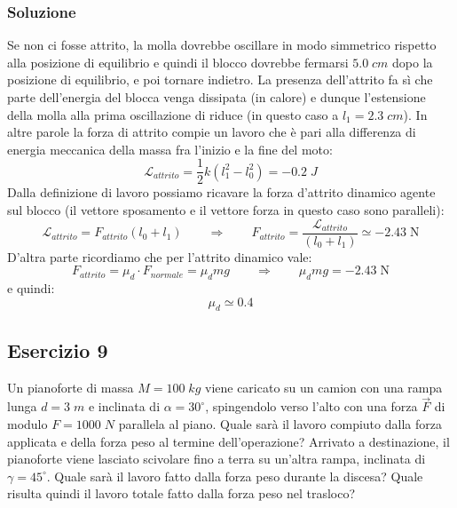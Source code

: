 \documentclass[12pt,a4paper]{book}
\begin{document}
\subsubsection*{Soluzione}
Se non ci fosse attrito, la molla dovrebbe oscillare in modo simmetrico rispetto alla posizione di equilibrio e quindi il blocco dovrebbe fermarsi $5.0\; cm$ dopo la posizione di equilibrio, e poi tornare indietro. La presenza dell'attrito fa sì che parte dell'energia del blocca venga dissipata (in calore) e dunque l'estensione della molla alla prima oscillazione di riduce (in questo caso a $l_1=2.3\;cm$). In altre parole la forza di attrito compie un lavoro che è pari alla differenza di energia meccanica 
della massa fra l'inizio e la fine del moto:
\begin{equation*}
\mathcal{L}
_{attrito}=\frac{1}{2}k(l_1^2-l_0^2)=-0.2\; J
\end{equation*}
Dalla definizione di lavoro possiamo ricavare la forza d'attrito dinamico agente sul blocco (il vettore sposamento 
e il vettore forza in questo caso sono paralleli):
\begin{equation*}
\mathcal{L}
_{attrito}=F_{attrito} (l_0+l_1)\qquad  \Rightarrow \qquad F_{attrito}=\frac{\mathcal{L}
_{attrito}}{(l_0+l_1)} \simeq -2.43 \; \text{N}
\end{equation*}
D'altra parte ricordiamo che per l'attrito dinamico vale:
\begin{equation*}
F_{attrito}=\mu_{d}\cdot F_{normale}=\mu_{d}  mg \qquad  \Rightarrow \qquad \mu_{d} mg=-2.43\; \text{N}
\end{equation*}
e quindi:
\begin{equation*}
\mu_{d}\simeq 0.4
\end{equation*}

\subsection*{Esercizio 9}
Un pianoforte di massa $M=100 \;kg$ viene caricato su un camion con una rampa lunga $d=3\; m$ e inclinata di $\alpha=30^{\circ}$, spingendolo verso l'alto con una forza $\vec{F}$ di modulo $F=1000 \; N$ parallela al piano. Quale sarà il lavoro compiuto dalla forza applicata e della forza peso al termine dell'operazione? Arrivato a destinazione, il pianoforte viene lasciato scivolare fino a terra su un'altra rampa, inclinata di $\gamma=45^{\circ}$. Quale sarà il lavoro fatto dalla forza peso durante la discesa? Quale risulta quindi il lavoro totale fatto dalla forza peso nel trasloco?
\end{document}
